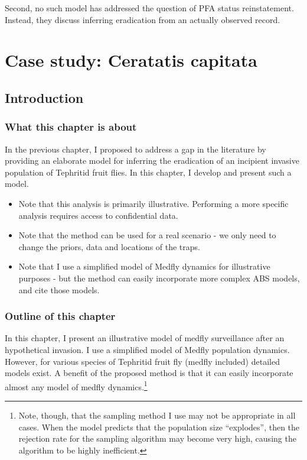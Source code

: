 \documentclass[
]{book}
\providecommand{\tightlist}{%
  \setlength{\itemsep}{0pt}\setlength{\parskip}{0pt}}
\begin{document}
Second, no such model has addressed the question of PFA status reinstatement. Instead, they discuss inferring eradication from an actually observed record.

\hypertarget{case-study-ceratatis-capitata}{%
\chapter{Case study: Ceratatis capitata}\label{case-study-ceratatis-capitata}}

\hypertarget{introduction-2}{%
\section{Introduction}\label{introduction-2}}

\hypertarget{what-this-chapter-is-about}{%
\subsection{What this chapter is about}\label{what-this-chapter-is-about}}

In the previous chapter, I proposed to address a gap in the literature by providing an elaborate model for inferring the eradication of an incipient invasive population of Tephritid fruit flies. In this chapter, I develop and present such a model.

\begin{itemize}
\tightlist
\item
  Note that this analysis is primarily illustrative. Performing a more specific analysis requires access to confidential data.
\item
  Note that the method can be used for a real scenario - we only need to change the priors, data and locations of the traps.
\item
  Note that I use a simplified model of Medfly dynamics for illustrative purposes - but the method can easily incorporate more complex ABS models, and cite those models.
\end{itemize}

\hypertarget{outline-of-this-chapter}{%
\subsection{Outline of this chapter}\label{outline-of-this-chapter}}

In this chapter, I present an illustrative model of medfly surveillance after an hypothetical invasion. I use a simplified model of Medfly population dynamics. However, for various species of Tephritid fruit fly (medfly included) detailed models exist. A benefit of the proposed method is that it can easily incorporate almost any model of medfly dynamics.\footnote{Note, though, that the sampling method I use may not be appropriate in all cases. When the model predicts that the population size ``explodes'', then the rejection rate for the sampling algorithm may become very high, causing the algorithm to be highly inefficient.}
\end{document}

